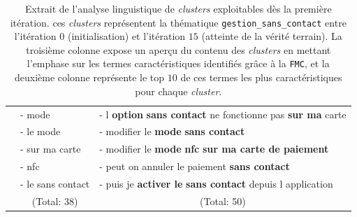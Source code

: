 \begin{table}[!htb]
\begin{center}
\begin{tabular}{|c|l|l|}
						& { \scriptsize - mode }
						& { \scriptsize - l \textbf{option} \textbf{sans contact} ne fonctionne pas \textbf{sur ma} carte }
						\tabularnewline
						
						& { \scriptsize - le mode }
						& { \scriptsize - modifier le \textbf{mode} \textbf{sans contact} }
						\tabularnewline
						
						& { \scriptsize - sur ma carte }
						& { \scriptsize - modifier le \textbf{mode} \textbf{nfc} \textbf{sur ma carte de paiement} }
						\tabularnewline
						
						& { \scriptsize - nfc }
						& { \scriptsize - peut on annuler le paiement \textbf{sans contact} }
						\tabularnewline
						
						& { \scriptsize - le sans contact }
						& { \scriptsize - puis je \textbf{activer le} \textbf{sans contact} depuis l application }
						\tabularnewline
						
						& \multicolumn{1}{c|}{
							\scriptsize (Total: 38)
						}
						& \multicolumn{1}{c|}{
							\scriptsize (Total: 50)
						}
						\tabularnewline
						\hline
					
				\end{tabular}
				\end{center}
				\caption{
					Extrait de l'analyse linguistique de \textit{clusters} exploitables dès la première itération.
					ces \textit{clusters} représentent la thématique \texttt{gestion\_sans\_contact} entre l'itération $0$ (initialisation) et l'itération $15$ (atteinte de la vérité terrain).
					La troisième colonne expose un aperçu du contenu des \textit{clusters} en mettant l'emphase sur les termes caractéristiques identifiés grâce à la \texttt{FMC}, et la deuxième colonne représente le top $10$ de ces termes les plus caractéristiques pour chaque \textit{cluster}.
				}
				\label{table:4.4.2-ETUDE-PERTINENCE-PATTERNS-LINGUISTIQUES-GESTION-SANS-CONTACT}
			\end{table}
			
